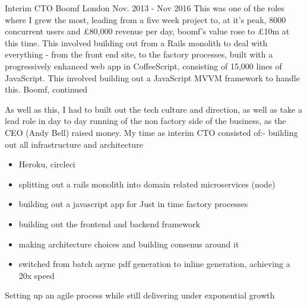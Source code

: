 \begin{cventries}
    \cventry
    {Interim CTO} %
    {Boomf} %
    {London} %
    {Nov. 2013 - Nov 2016} %
    {
      This was one of the roles where I grew the most, leading from a five week project to, at it's peak, 8000 concurrent users and £80,000 revenue per day, boomf's value rose to £10m at this time.
      \newline
      \vspace{0.25cm}
      This involved building out from a Rails monolith to deal with everything - from the front end site, to the factory processes, built with a progressively enhanced web app in CoffeeScript, consisting of 15,000 lines of JavaScript. This involved building out a JavaScript MVVM framework to handle this.
      }
    \cventry
    {Boomf, continued} %
    {} %
    {} %
    {} %
    {
      As well as this, I had to built out the tech culture and direction, as well as take a lead role in day to day running of the non factory side of the business, as the CEO (Andy Bell) raised money.
      \newline
      \vspace{0.25cm}
      My time as interim CTO consisted of:-
      \newline
      \vspace{0.25cm}
      building out all infrastructure and architecture
      \vspace{0.25cm}
      \begin{itemize} %
        \setlength\itemsep{0.25em}
        \item {Heroku, circleci}
        \item {splitting out a rails monolith into domain related microservices (node)}
        \item {building out a javascript app for Just in time factory processes }
        \item {building out the frontend and backend framework}
        \item {making architecture choices and building consenus around it}
        \item {switched from batch async pdf generation to inline generation, achieving a 20x speed}       
      \end{itemize}
      \vspace{0.25cm}
      Setting up an agile process while still delivering under exponential growth
      \begin{itemize} %

\end{itemize}}
\end{cventries}
